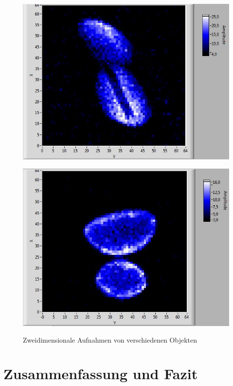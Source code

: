 \documentclass[a4paper]{scrartcl} %
\begin{document}
\begin{figure}[htbp]
{		\parbox{0.48\textwidth}{
			\centering
			\includegraphics[width=1.0 \linewidth]{./Resources/Teil_3/peanut_shell.JPG}
			\label{fig:2d_erdnuss}}
		\hfill  
		\parbox{0.48\textwidth}{
			\centering
			\includegraphics[width=1.0 \linewidth]{./Resources/Teil_3/aloevera_2d.JPG}
			\label{fig:2d_aloevera}}
		
	}	
	\caption{Zweidimensionale Aufnahmen von verschiedenen Objekten}
	\label{fig:2d_main}
	
\end{figure}

\newpage

\section{Zusammenfassung und Fazit}
\end{document}
